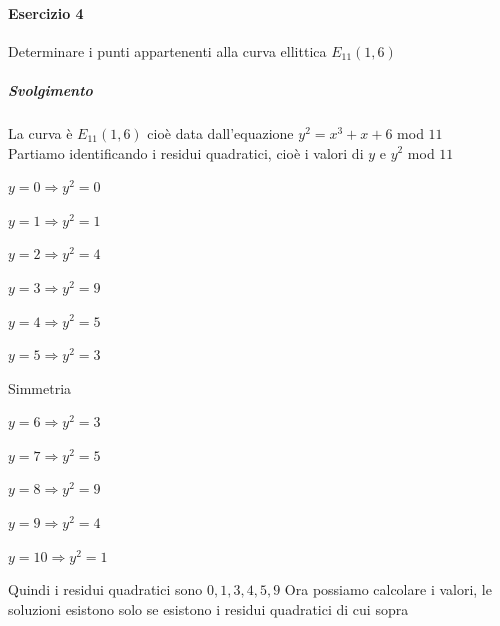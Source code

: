 \documentclass[10pt]{book}
\begin{document}
\paragraph{Esercizio 4} Determinare i punti appartenenti alla curva ellittica $E_{11}(1,6)$
\subparagraph{Svolgimento} La curva è $E_{11}(1,6)$ cioè data dall'equazione $y^2 = x^3 + x + 6$ mod $11$\\
Partiamo identificando i residui quadratici, cioè i valori di $y$ e $y^2$ mod $11$
\begin{multicols}{2}
\begin{list}{}{}
	\item $y=0\Rightarrow y^2 = 0$
	\item $y=1\Rightarrow y^2 = 1$
	\item $y=2\Rightarrow y^2 = 4$
	\item $y=3\Rightarrow y^2 = 9$
	\item $y=4\Rightarrow y^2 = 5$
	\item $y=5\Rightarrow y^2 = 3$
	\item Simmetria
	\item $y=6\Rightarrow y^2 = 3$
	\item $y=7\Rightarrow y^2 = 5$
	\item $y=8\Rightarrow y^2 = 9$
	\item $y=9\Rightarrow y^2 = 4$
	\item $y=10\Rightarrow y^2 = 1$
\end{list}
\end{multicols}
Quindi i residui quadratici sono $0,1,3,4,5,9$
Ora possiamo calcolare i valori, le soluzioni esistono solo se esistono i residui quadratici di cui sopra
\end{document}
